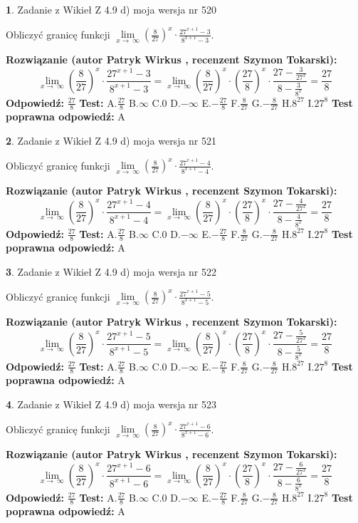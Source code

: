 \documentclass[12pt, a4paper]{article}
\theoremstyle{definition} %
\newtheorem{zad}{}
\newcommand{\zadStart}[1]{\begin{zad}#1\newline}
\newcommand{\zadStop}{\end{zad}}
\newcommand{\rozwStart}[2]{\noindent \textbf{Rozwiązanie (autor #1 , recenzent #2): }\newline}
\newcommand{\rozwStop}{\newline}
\newcommand{\odpStart}{\noindent \textbf{Odpowiedź:}\newline}
\newcommand{\odpStop}{\newline}
\newcommand{\testStart}{\noindent \textbf{Test:}\newline}
\newcommand{\testStop}{\newline}
\newcommand{\kluczStart}{\noindent \textbf{Test poprawna odpowiedź:}\newline}
\newcommand{\kluczStop}{\newline}
\begin{document}
\zadStart{Zadanie z Wikieł Z 4.9 d) moja wersja nr 520}


Obliczyć granicę funkcji  $\lim\limits_{x\to\ \infty}(\frac{8}{27})^{x}\cdot\frac{27^{x+1}-3}{8^{x+1}-3}$.
\zadStop
\rozwStart{Patryk Wirkus}{Szymon Tokarski}
$$\lim\limits_{x\to\ \infty}(\frac{8}{27})^{x}\cdot\frac{27^{x+1}-3}{8^{x+1}-3}=\lim\limits_{x\to\ \infty}(\frac{8}{27})^{x}\cdot(\frac{27}{8})^{x} \cdot \frac{27-\frac{3}{27^{x}}}{8-\frac{3}{8^{x}}} = \frac{27}{8}$$
\rozwStop
\odpStart
$\frac{27}{8}$
\odpStop
\testStart
A.$\frac{27}{8}$ B.$\infty$ C.$0$ D.$-\infty$ E.$-\frac{27}{8}$
F.$\frac{8}{27}$ G.$-\frac{8}{27}$
H.$8^{27}$
I.$27^{8}$
\testStop
\kluczStart
A
\kluczStop



\zadStart{Zadanie z Wikieł Z 4.9 d) moja wersja nr 521}


Obliczyć granicę funkcji  $\lim\limits_{x\to\ \infty}(\frac{8}{27})^{x}\cdot\frac{27^{x+1}-4}{8^{x+1}-4}$.
\zadStop
\rozwStart{Patryk Wirkus}{Szymon Tokarski}
$$\lim\limits_{x\to\ \infty}(\frac{8}{27})^{x}\cdot\frac{27^{x+1}-4}{8^{x+1}-4}=\lim\limits_{x\to\ \infty}(\frac{8}{27})^{x}\cdot(\frac{27}{8})^{x} \cdot \frac{27-\frac{4}{27^{x}}}{8-\frac{4}{8^{x}}} = \frac{27}{8}$$
\rozwStop
\odpStart
$\frac{27}{8}$
\odpStop
\testStart
A.$\frac{27}{8}$ B.$\infty$ C.$0$ D.$-\infty$ E.$-\frac{27}{8}$
F.$\frac{8}{27}$ G.$-\frac{8}{27}$
H.$8^{27}$
I.$27^{8}$
\testStop
\kluczStart
A
\kluczStop



\zadStart{Zadanie z Wikieł Z 4.9 d) moja wersja nr 522}


Obliczyć granicę funkcji  $\lim\limits_{x\to\ \infty}(\frac{8}{27})^{x}\cdot\frac{27^{x+1}-5}{8^{x+1}-5}$.
\zadStop
\rozwStart{Patryk Wirkus}{Szymon Tokarski}
$$\lim\limits_{x\to\ \infty}(\frac{8}{27})^{x}\cdot\frac{27^{x+1}-5}{8^{x+1}-5}=\lim\limits_{x\to\ \infty}(\frac{8}{27})^{x}\cdot(\frac{27}{8})^{x} \cdot \frac{27-\frac{5}{27^{x}}}{8-\frac{5}{8^{x}}} = \frac{27}{8}$$
\rozwStop
\odpStart
$\frac{27}{8}$
\odpStop
\testStart
A.$\frac{27}{8}$ B.$\infty$ C.$0$ D.$-\infty$ E.$-\frac{27}{8}$
F.$\frac{8}{27}$ G.$-\frac{8}{27}$
H.$8^{27}$
I.$27^{8}$
\testStop
\kluczStart
A
\kluczStop



\zadStart{Zadanie z Wikieł Z 4.9 d) moja wersja nr 523}


Obliczyć granicę funkcji  $\lim\limits_{x\to\ \infty}(\frac{8}{27})^{x}\cdot\frac{27^{x+1}-6}{8^{x+1}-6}$.
\zadStop
\rozwStart{Patryk Wirkus}{Szymon Tokarski}
$$\lim\limits_{x\to\ \infty}(\frac{8}{27})^{x}\cdot\frac{27^{x+1}-6}{8^{x+1}-6}=\lim\limits_{x\to\ \infty}(\frac{8}{27})^{x}\cdot(\frac{27}{8})^{x} \cdot \frac{27-\frac{6}{27^{x}}}{8-\frac{6}{8^{x}}} = \frac{27}{8}$$
\rozwStop
\odpStart
$\frac{27}{8}$
\odpStop
\testStart
A.$\frac{27}{8}$ B.$\infty$ C.$0$ D.$-\infty$ E.$-\frac{27}{8}$
F.$\frac{8}{27}$ G.$-\frac{8}{27}$
H.$8^{27}$
I.$27^{8}$
\testStop
\kluczStart
A
\kluczStop
\end{document}

